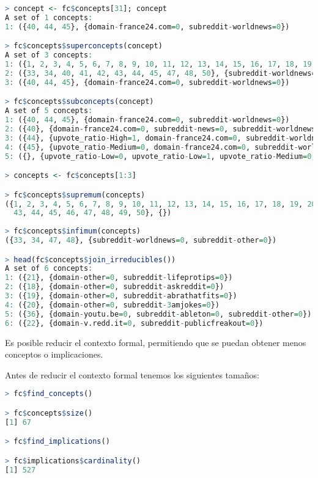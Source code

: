 \documentclass[../../main.tex]{subfiles}
\begin{document}
\begin{lstlisting}[language=R]
> concept <- fc$concepts[31]; concept
A set of 1 concepts:
1: ({40, 44, 45}, {domain-france24.com=0, subreddit-worldnews=0})

> fc$concepts$superconcepts(concept)
A set of 3 concepts:
1: ({1, 2, 3, 4, 5, 6, 7, 8, 9, 10, 11, 12, 13, 14, 15, 16, 17, 18, 19, 20, 21, 22, 23, 24, 25, 26, 27, 28, 29, 30, 31, 32, 33, 34, 35, 36, 37, 38, 39, 40, 41, 42, 43, 44, 45, 46, 47, 48, 49, 50}, {})
2: ({33, 34, 40, 41, 42, 43, 44, 45, 47, 48, 50}, {subreddit-worldnews=0})
3: ({40, 44, 45}, {domain-france24.com=0, subreddit-worldnews=0})

> fc$concepts$subconcepts(concept)
A set of 5 concepts:
1: ({40, 44, 45}, {domain-france24.com=0, subreddit-worldnews=0})
2: ({40}, {domain-france24.com=0, subreddit-news=0, subreddit-worldnews=0})
3: ({44}, {upvote_ratio-High=1, domain-france24.com=0, subreddit-worldnews=0})
4: ({45}, {upvote_ratio-Medium=0, domain-france24.com=0, subreddit-worldnews=0})
5: ({}, {upvote_ratio-Low=0, upvote_ratio-Low=1, upvote_ratio-Medium=0, upvote_ratio-Medium=1, ....})

> concepts <- fc$concepts[1:3]

> fc$concepts$supremum(concepts)
({1, 2, 3, 4, 5, 6, 7, 8, 9, 10, 11, 12, 13, 14, 15, 16, 17, 18, 19, 20, 21, 22, 23, 24, 25, 26, 27, 28, 29, 30, 31, 32, 33, 34, 35, 36, 37, 38, 39, 40, 41, 42,
  43, 44, 45, 46, 47, 48, 49, 50}, {})
  
> fc$concepts$infimum(concepts)
({33, 34, 47, 48}, {subreddit-worldnews=0, subreddit-other=0})

> head(fc$concepts$join_irreducibles())
A set of 6 concepts:
1: ({21}, {domain-other=0, subreddit-lifeprotips=0})
2: ({18}, {domain-other=0, subreddit-askreddit=0})
3: ({19}, {domain-other=0, subreddit-abrathatfits=0})
4: ({20}, {domain-other=0, subreddit-3amjokes=0})
5: ({36}, {domain-youtu.be=0, subreddit-ableton=0, subreddit-other=0})
6: ({22}, {domain-v.redd.it=0, subreddit-publicfreakout=0})
\end{lstlisting}

\vskip 0.2in

Es posible reducir el contexto formal, permitiendo que se puedan obtener menos conceptos o implicaciones. 

Antes de reducir el contexto formal tenemos los siguientes tamaños:

\begin{lstlisting}[language=R]
> fc$find_concepts()

> fc$concepts$size()
[1] 67

> fc$find_implications()

> fc$implications$cardinality()
[1] 527
\end{lstlisting}
\end{document}

